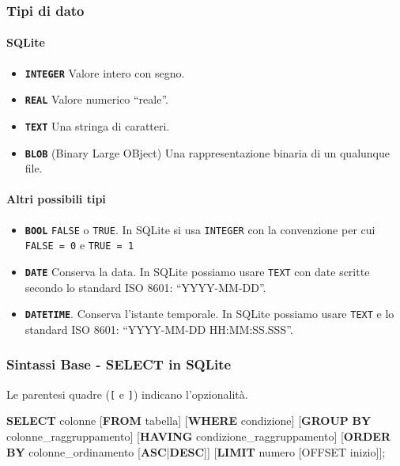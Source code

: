 \documentclass[
]{article}
\newenvironment{Shaded}{}{}
\newcommand{\KeywordTok}[1]{\textcolor[rgb]{0.00,0.44,0.13}{\textbf{#1}}}
\newcommand{\NormalTok}[1]{#1}
\providecommand{\tightlist}{%
  \setlength{\itemsep}{0pt}\setlength{\parskip}{0pt}}
\begin{document}
\subsubsection{Tipi di dato}\label{tipi-di-dato}

\paragraph{SQLite}\label{sqlite}

\begin{itemize}
\item
  \textbf{\texttt{INTEGER}} Valore intero con segno.
\item
  \textbf{\texttt{REAL}} Valore numerico ``reale''.
\item
  \textbf{\texttt{TEXT}} Una stringa di caratteri.
\item
  \textbf{\texttt{BLOB}} (Binary Large OBject) Una rappresentazione
  binaria di un qualunque file.
\end{itemize}

\paragraph{Altri possibili tipi}\label{altri-possibili-tipi}

\begin{itemize}
\tightlist
\item
  \textbf{\texttt{BOOL}} \texttt{FALSE} o \texttt{TRUE}. In SQLite si
  usa \texttt{INTEGER} con la convenzione per cui \texttt{FALSE\ =\ 0} e
  \texttt{TRUE\ =\ 1}
\item
  \textbf{\texttt{DATE}} Conserva la data. In SQLite possiamo usare
  \texttt{TEXT} con date scritte secondo lo standard ISO 8601:
  ``YYYY-MM-DD''.
\item
  \textbf{\texttt{DATETIME}}. Conserva l'istante temporale. In SQLite
  possiamo usare \texttt{TEXT} e lo standard ISO 8601: ``YYYY-MM-DD
  HH:MM:SS.SSS''.
\end{itemize}

\subsubsection{Sintassi Base - SELECT in
SQLite}\label{sintassi-base---select-in-sqlite}

Le parentesi quadre (\texttt{{[}} e \texttt{{]}}) indicano
l'opzionalità.

\begin{Shaded}
\begin{Highlighting}[]
\KeywordTok{SELECT}\NormalTok{ colonne}
\NormalTok{[}\KeywordTok{FROM}\NormalTok{ tabella]}
\NormalTok{[}\KeywordTok{WHERE}\NormalTok{ condizione]}
\NormalTok{[}\KeywordTok{GROUP} \KeywordTok{BY}\NormalTok{ colonne\_raggruppamento]}
\NormalTok{[}\KeywordTok{HAVING}\NormalTok{ condizione\_raggruppamento]}
\NormalTok{[}\KeywordTok{ORDER} \KeywordTok{BY}\NormalTok{ colonne\_ordinamento [}\KeywordTok{ASC}\NormalTok{|}\KeywordTok{DESC}\NormalTok{]]}
\NormalTok{[}\KeywordTok{LIMIT}\NormalTok{ numero [OFFSET inizio]];}
\end{Highlighting}
\end{Shaded}
\end{document}
